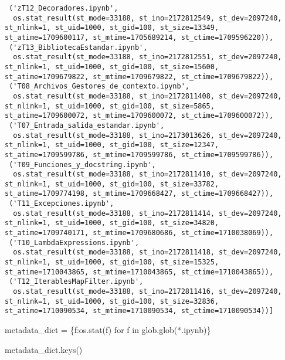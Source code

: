 \documentclass[
  letterpaper,
  DIV=11,
  numbers=noendperiod]{scrreprt}
\newenvironment{Shaded}{\begin{snugshade}}{\end{snugshade}}
\newcommand{\ControlFlowTok}[1]{\textcolor[rgb]{0.00,0.23,0.31}{#1}}
\newcommand{\KeywordTok}[1]{\textcolor[rgb]{0.00,0.23,0.31}{#1}}
\newcommand{\NormalTok}[1]{\textcolor[rgb]{0.00,0.23,0.31}{#1}}
\newcommand{\OperatorTok}[1]{\textcolor[rgb]{0.37,0.37,0.37}{#1}}
\newcommand{\StringTok}[1]{\textcolor[rgb]{0.13,0.47,0.30}{#1}}
\begin{document}
\begin{verbatim}
 ('zT12_Decoradores.ipynb',
  os.stat_result(st_mode=33188, st_ino=2172812549, st_dev=2097240, st_nlink=1, st_uid=1000, st_gid=100, st_size=13349, st_atime=1709600117, st_mtime=1705689214, st_ctime=1709596220)),
 ('zT13_BibliotecaEstandar.ipynb',
  os.stat_result(st_mode=33188, st_ino=2172812551, st_dev=2097240, st_nlink=1, st_uid=1000, st_gid=100, st_size=15600, st_atime=1709679822, st_mtime=1709679822, st_ctime=1709679822)),
 ('T08_Archivos_Gestores_de_contexto.ipynb',
  os.stat_result(st_mode=33188, st_ino=2172811408, st_dev=2097240, st_nlink=1, st_uid=1000, st_gid=100, st_size=5865, st_atime=1709600072, st_mtime=1709600072, st_ctime=1709600072)),
 ('T07_Entrada_salida_estandar.ipynb',
  os.stat_result(st_mode=33188, st_ino=2173013626, st_dev=2097240, st_nlink=1, st_uid=1000, st_gid=100, st_size=12347, st_atime=1709599786, st_mtime=1709599786, st_ctime=1709599786)),
 ('T09_Funciones_y_docstring.ipynb',
  os.stat_result(st_mode=33188, st_ino=2172811410, st_dev=2097240, st_nlink=1, st_uid=1000, st_gid=100, st_size=33782, st_atime=1709774198, st_mtime=1709668427, st_ctime=1709668427)),
 ('T11_Excepciones.ipynb',
  os.stat_result(st_mode=33188, st_ino=2172811414, st_dev=2097240, st_nlink=1, st_uid=1000, st_gid=100, st_size=34820, st_atime=1709740171, st_mtime=1709680686, st_ctime=1710038069)),
 ('T10_LambdaExpressions.ipynb',
  os.stat_result(st_mode=33188, st_ino=2172811418, st_dev=2097240, st_nlink=1, st_uid=1000, st_gid=100, st_size=15325, st_atime=1710043865, st_mtime=1710043865, st_ctime=1710043865)),
 ('T12_IterablesMapFilter.ipynb',
  os.stat_result(st_mode=33188, st_ino=2172811416, st_dev=2097240, st_nlink=1, st_uid=1000, st_gid=100, st_size=32836, st_atime=1710090534, st_mtime=1710090534, st_ctime=1710090534))]
\end{verbatim}

\begin{Shaded}
\begin{Highlighting}[]
\NormalTok{metadata\_dict }\OperatorTok{=}\NormalTok{ \{f:os.stat(f) }\ControlFlowTok{for}\NormalTok{ f }\KeywordTok{in}\NormalTok{ glob.glob(}\StringTok{\textquotesingle{}*.ipynb\textquotesingle{}}\NormalTok{)\}}
\end{Highlighting}
\end{Shaded}

\begin{Shaded}
\begin{Highlighting}[]
\NormalTok{metadata\_dict.keys()}
\end{Highlighting}
\end{Shaded}
\end{document}

